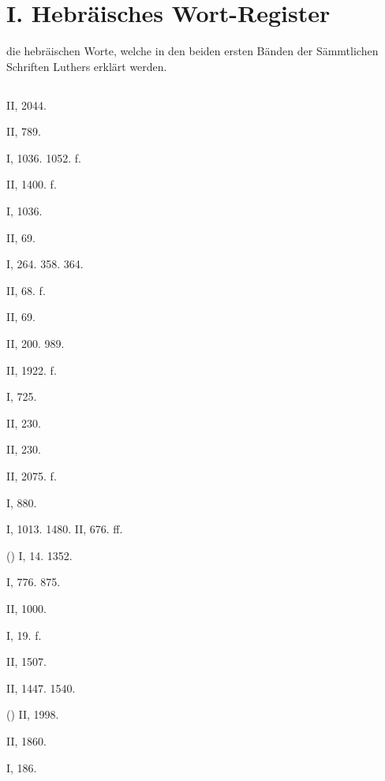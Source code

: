 \chapter{I. Hebräisches Wort-Register}


die hebräischen Worte, welche in den beiden ersten Bänden der Sämmtlichen Schriften Luthers erklärt werden.

\section{}

 II, 2044.

 II, 789.

 I, 1036. 1052. f.

 II, 1400. f.

 I, 1036.

 II, 69.

 I, 264. 358. 364.

 II, 68. f.

 II, 69.

 II, 200. 989.

 II, 1922. f.

 I, 725.

 II, 230.

 II, 230.

 II, 2075. f.

 I, 880.

 I, 1013. 1480. II, 676. ff.

 () I, 14. 1352.

 I, 776. 875.

 II, 1000.

 I, 19. f.

 II, 1507.

 II, 1447. 1540.

 () II, 1998.

 II, 1860.

 I, 186.

